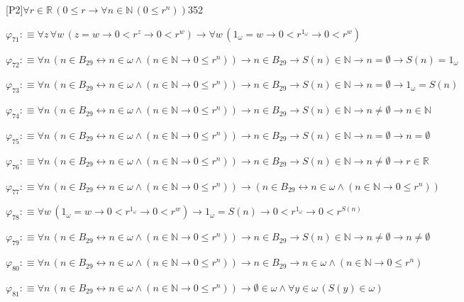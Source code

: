 \begin{fullproof}{[P2]}{$\forall r \in \mathbb{R}\,(0 \leq r \to \forall n \in \mathbb{N}\,(0 \leq {{r}^{n}}))$}{352}
\begin{abbrevlist}
\item $\varphi_{71} :\equiv \forall z\,\forall w\,(z = w \to 0 < {{r}^{z}} \to 0 < {{r}^{w}}) \to \forall w\,(1_{\omega} = w \to 0 < {{r}^{1_{\omega}}} \to 0 < {{r}^{w}})$
\item $\varphi_{72} :\equiv \forall n\,(n \in B_{29} \leftrightarrow n \in \omega \land (n \in \mathbb{N} \to 0 \leq {{r}^{n}})) \to n \in B_{29} \to S(n) \in \mathbb{N} \to n = \emptyset \to S(n) = 1_{\omega}$
\item $\varphi_{73} :\equiv \forall n\,(n \in B_{29} \leftrightarrow n \in \omega \land (n \in \mathbb{N} \to 0 \leq {{r}^{n}})) \to n \in B_{29} \to S(n) \in \mathbb{N} \to n = \emptyset \to 1_{\omega} = S(n)$
\item $\varphi_{74} :\equiv \forall n\,(n \in B_{29} \leftrightarrow n \in \omega \land (n \in \mathbb{N} \to 0 \leq {{r}^{n}})) \to n \in B_{29} \to S(n) \in \mathbb{N} \to n \neq \emptyset \to n \in \mathbb{N}$
\item $\varphi_{75} :\equiv \forall n\,(n \in B_{29} \leftrightarrow n \in \omega \land (n \in \mathbb{N} \to 0 \leq {{r}^{n}})) \to n \in B_{29} \to S(n) \in \mathbb{N} \to n = \emptyset \to n = \emptyset$
\item $\varphi_{76} :\equiv \forall n\,(n \in B_{29} \leftrightarrow n \in \omega \land (n \in \mathbb{N} \to 0 \leq {{r}^{n}})) \to n \in B_{29} \to S(n) \in \mathbb{N} \to n \neq \emptyset \to r \in \mathbb{R}$
\item $\varphi_{77} :\equiv \forall n\,(n \in B_{29} \leftrightarrow n \in \omega \land (n \in \mathbb{N} \to 0 \leq {{r}^{n}})) \to (n \in B_{29} \leftrightarrow n \in \omega \land (n \in \mathbb{N} \to 0 \leq {{r}^{n}}))$
\item $\varphi_{78} :\equiv \forall w\,(1_{\omega} = w \to 0 < {{r}^{1_{\omega}}} \to 0 < {{r}^{w}}) \to 1_{\omega} = S(n) \to 0 < {{r}^{1_{\omega}}} \to 0 < {{r}^{S(n)}}$
\item $\varphi_{79} :\equiv \forall n\,(n \in B_{29} \leftrightarrow n \in \omega \land (n \in \mathbb{N} \to 0 \leq {{r}^{n}})) \to n \in B_{29} \to S(n) \in \mathbb{N} \to n \neq \emptyset \to n \neq \emptyset$
\item $\varphi_{80} :\equiv \forall n\,(n \in B_{29} \leftrightarrow n \in \omega \land (n \in \mathbb{N} \to 0 \leq {{r}^{n}})) \to n \in B_{29} \to n \in \omega \land (n \in \mathbb{N} \to 0 \leq {{r}^{n}})$
\item $\varphi_{81} :\equiv \forall n\,(n \in B_{29} \leftrightarrow n \in \omega \land (n \in \mathbb{N} \to 0 \leq {{r}^{n}})) \to \emptyset \in \omega \land \forall y \in \omega\,(S(y) \in \omega)$

\end{abbrevlist}
\end{fullproof}
